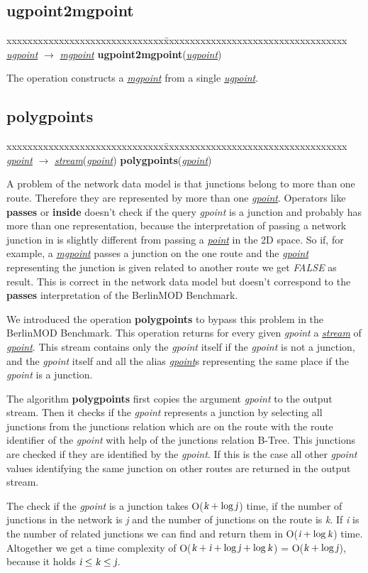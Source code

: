 \documentclass[a4paper]{article}
\newcommand{\bmodb} {BerlinMOD Benchmark}
\newcommand{\op}[1]{\textbf{#1}}
\newcommand{\var}[1]{\textsl{#1}}
\newcommand{\dt}[1]{\textsl{\underline{#1}}}
\newcommand{\false}{\var{FALSE}}
\begin{document}
\subsection{\op{ugpoint2mgpoint}}
\begin{tabbing}
xxxxxxxxxxxxxxxxxxxxxxxxxxxxxx\=xxxxxxxxxxxxxxxxxxxxxxxxxxxxxxxxxxx\kill
\dt{ugpoint} $\rightarrow$ \dt{mgpoint}\> \op{ugpoint2mgpoint}(\dt{ugpoint})\\
\end{tabbing}
The operation constructs a \dt{mgpoint} from a single \dt{ugpoint}.
\subsection{\op{polygpoints}}
\begin{tabbing}
xxxxxxxxxxxxxxxxxxxxxxxxxxxxxx\=xxxxxxxxxxxxxxxxxxxxxxxxxxxxxxxxxxx\kill
\dt{gpoint} $\rightarrow$ \dt{stream}(\dt{gpoint}) \> \op{polygpoints}(\dt{gpoint})\\
\end{tabbing}
A problem of the network data model is that junctions belong to more than one route. Therefore they are represented by more than one \dt{gpoint}. Operators like \op{passes} or \op{inside} doesn't check if the query \var{gpoint} is a junction and probably has more than one representation, because the interpretation of passing a network junction in \cite{1146465} is slightly different from passing a \dt{point} in the 2D space. So if, for example, a \dt{mgpoint} passes a junction on the one route and the \dt{gpoint} representing the junction is given related to another route we get \false{} as result. This is correct in the network data model but doesn't correspond to the \op{passes} interpretation of the \bmodb{}.

We introduced the operation \op{polygpoints} to bypass this problem in the \bmodb{}. This operation returns for every given \var{gpoint} a \dt{stream} of \dt{gpoint}. This stream contains only the \var{gpoint} itself if the \var{gpoint} is not a junction, and the \var{gpoint} itself and all the alias \dt{gpoint}s representing the same place if the \var{gpoint} is a junction.

The algorithm \op{polygpoints} first copies the argument \var{gpoint} to the output stream. Then it checks if the \var{gpoint} represents a junction by selecting all junctions from the junctions relation which are on the route with the route identifier of the \var{gpoint} with help of the junctions relation B-Tree. This junctions are checked if they are identified by the \var{gpoint}. If this is the case all other \var{gpoint} values identifying the same junction on other routes are returned in the output stream.

The check if the \var{gpoint} is a junction takes O($\var{k} + \log \var{j}$) time, if the number of junctions in the network is \var{j} and the number of junctions on the route is \var{k}. If \var{i} is the number of related junctions we can find and return them in O($\var{i} + \log \var{k}$) time. Altogether we get a time complexity of O($\var{k} + \var{i} + \log \var{j} + \log \var{k}$) = O($\var{k} + \log \var{j}$), because it holds $\var{i}\leq \var{k} \leq \var{j}$.
{}

\end{document}

